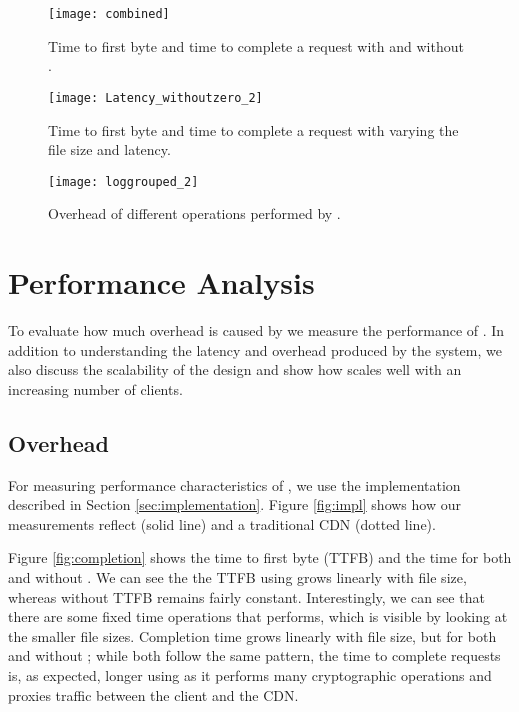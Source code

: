 \begin{figure*}[t!]
\vspace{-2mm}
  \begin{minipage}[t]{.31\linewidth}
    \centering
     \texttt{[image: combined]}
    \caption{Time to first byte and time to complete a request with and without \system{}.}
    \label{fig:completion}
  \end{minipage}
  \hfill
  \begin{minipage}[t]{.29\linewidth}
    \centering
    \texttt{[image: Latency\_withoutzero\_2]}
    \caption{Time to first byte and time to complete a request with varying the file size and latency.}%
    \label{fig:latency}
  \end{minipage}
  \hfill
  \begin{minipage}[t]{.35\linewidth}
    \centering
    \texttt{[image: loggrouped\_2]}
\caption{Overhead of different operations performed by \system{}.}
\label{fig:overhead2}
  \end{minipage}
\end{figure*}


\section{Performance Analysis}
\label{sec:performance}
To evaluate how much overhead is caused by \system{} we measure the performance 
of \system{}.  In addition to understanding the latency and overhead produced by the 
system, we also discuss the scalability of the design and show how \system{} scales 
well with an increasing number of clients.

\subsection{\system{} Overhead}
For measuring performance characteristics of \system{}, we use the implementation 
described in Section \ref{sec:implementation}.  Figure \ref{fig:impl} shows 
how our measurements reflect \system{} (solid line) and a traditional CDN (dotted 
line).  

Figure \ref{fig:completion} shows the time to first byte (TTFB) and the time for both \system{} and 
without \system{}.  We can see the the TTFB using \system{} grows linearly with 
file size, whereas without \system{} TTFB remains fairly constant.  Interestingly, 
we can see that there are some fixed time operations that \system{} performs, which 
is visible by looking at the smaller file sizes. Completion time grows linearly with file size, but for both \system{} and without \system{}; while both follow the 
same pattern, the time to complete requests is, as expected, longer using \system{} as it performs many cryptographic operations and proxies traffic between the client and the CDN.

